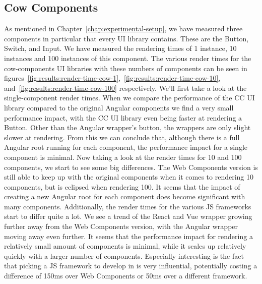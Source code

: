 \subsection{Cow Components}
As mentioned in Chapter~\ref{chap:experimental-setup}, we have measured three components in particular that every UI library contains. These are the Button, Switch, and Input. We have measured the rendering times of 1 instance, 10 instances and 100 instances of this component. The various render times for the cow-components UI libraries with these numbers of components can be seen in figures~\ref{fig:results:render-time-cow-1},~\ref{fig:results:render-time-cow-10}, and~\ref{fig:results:render-time-cow-100} respectively. We'll first take a look at the single-component render times. When we compare the performance of the CC UI library compared to the original Angular components we find a very small performance impact, with the CC UI library even being faster at rendering a Button. Other than the Angular wrapper's button, the wrappers are only slight slower at rendering. From this we can conclude that, although there is a full Angular root running for each component, the performance impact for a single component is minimal. Now taking a look at the render times for 10 and 100 components, we start to see some big differences. The Web Components version is still able to keep up with the original components when it comes to rendering 10 components, but is eclipsed when rendering 100. It seems that the impact of creating a new Angular root for each component does become significant with many components. Additionally, the render times for the various JS frameworks start to differ quite a lot. We see a trend of the React and Vue wrapper growing further away from the Web Components version, with the Angular wrapper moving away even further. It seems that the performance impact for rendering a relatively small amount of components is minimal, while it scales up relatively quickly with a larger number of components. Especially interesting is the fact that picking a JS framework to develop in is very influential, potentially costing a difference of 150ms over Web Components or 50ms over a different framework.

